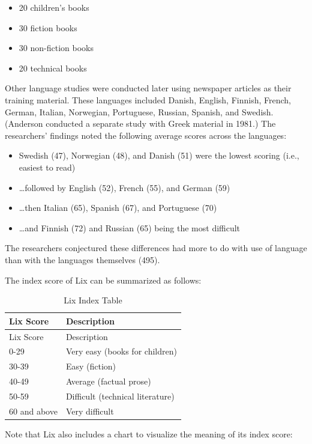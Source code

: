 \documentclass[
]{book}
\providecommand{\tightlist}{%
  \setlength{\itemsep}{0pt}\setlength{\parskip}{0pt}}
\theoremstyle{definition}
\theoremstyle{definition}
\theoremstyle{definition}
\theoremstyle{definition}
\theoremstyle{remark}
\begin{document}
\begin{itemize}
\tightlist
\item
  20 children's books
\item
  30 fiction books
\item
  30 non-fiction books
\item
  20 technical books
\end{itemize}

Other language studies were conducted later using newspaper articles as their training material. These languages included Danish, English, Finnish, French, German, Italian, Norwegian, Portuguese, Russian, Spanish, and Swedish. (Anderson conducted a separate study with Greek material in 1981.) The researchers' findings noted the following average scores across the languages:

\begin{itemize}
\tightlist
\item
  Swedish (47), Norwegian (48), and Danish (51) were the lowest scoring (i.e., easiest to read)
\item
  \ldots followed by English (52), French (55), and German (59)
\item
  \ldots then Italian (65), Spanish (67), and Portuguese (70)
\item
  \ldots and Finnish (72) and Russian (65) being the most difficult
\end{itemize}

The researchers conjectured these differences had more to do with use of language than with the languages themselves (495).

The index score of Lix can be summarized as follows:

\begin{longtable}[]{@{}ll@{}}
\caption{Lix Index Table}\tabularnewline
\toprule
Lix Score & Description \\
\midrule
\endfirsthead
\toprule
Lix Score & Description \\
\midrule
\endhead
0-29 & Very easy (books for children) \\
30-39 & Easy (fiction) \\
40-49 & Average (factual prose) \\
50-59 & Difficult (technical literature) \\
60 and above & Very difficult \\
\bottomrule
\end{longtable}

Note that Lix also includes a chart to visualize the meaning of its index score:
\end{document}
